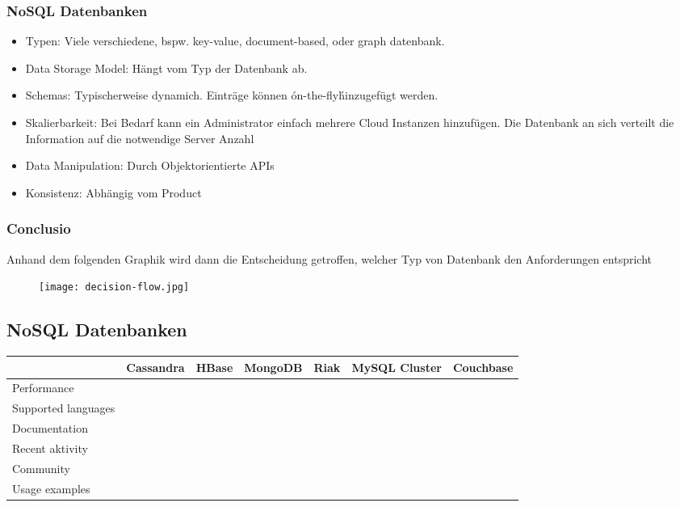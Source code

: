 		\subsubsection{NoSQL Datenbanken}
			\begin{itemize}
				\item Typen: Viele verschiedene, bspw. key-value, document-based, oder graph datenbank.
				\item Data Storage Model: Hängt vom Typ der Datenbank ab.
				\item Schemas: Typischerweise dynamich. Einträge können \'on-the-fly\' hinzugefügt werden.
				\item Skalierbarkeit: Bei Bedarf kann ein Administrator einfach mehrere Cloud Instanzen hinzufügen. Die Datenbank an sich verteilt die Information auf die notwendige Server Anzahl
				\item Data Manipulation: Durch Objektorientierte APIs
				\item Konsistenz: Abhängig vom Product
			\end{itemize}

		\newpage
		\vfill
		\subsubsection{Conclusio}
		Anhand dem folgenden Graphik wird dann die Entscheidung getroffen, welcher Typ von Datenbank den Anforderungen entspricht
		 
		\begin{figure}[h!]
			\texttt{[image: decision-flow.jpg]}
			\centering
		\end{figure}
		\newpage
		\vfill

	\subsection{NoSQL Datenbanken}

		\begin{tabular} {| l | c | c | c | c | c | c |}
			\hline
			& Cassandra & HBase & MongoDB & Riak & MySQL Cluster & Couchbase		\\ \hline \hline
			Performance &  &	 &  &  &  &  &		\\ \hline
			Supported languages &  &	 &  &  &  &  &	 			\\ \hline
			Documentation &  &	 &  &  &  &  &	 		\\ \hline
			Recent aktivity &  &	 &  &  &  &  &			\\ \hline
			Community &  &  &  &  &  &  &		\\ \hline 
			Usage examples	&  &	&  &  &  &  &					\\ \hline
		\end{tabular}


